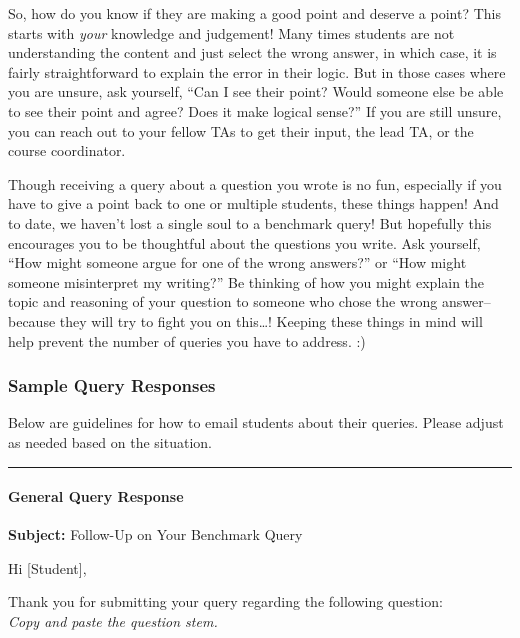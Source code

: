\documentclass[
]{article}
\begin{document}
So, how do you know if they are making a good point and deserve a point? This starts with \emph{your} knowledge and judgement! Many times students are not understanding the content and just select the wrong answer, in which case, it is fairly straightforward to explain the error in their logic. But in those cases where you are unsure, ask yourself, ``Can I see their point? Would someone else be able to see their point and agree? Does it make logical sense?'' If you are still unsure, you can reach out to your fellow TAs to get their input, the lead TA, or the course coordinator.

Though receiving a query about a question you wrote is no fun, especially if you have to give a point back to one or multiple students, these things happen! And to date, we haven't lost a single soul to a benchmark query! But hopefully this encourages you to be thoughtful about the questions you write. Ask yourself, ``How might someone argue for one of the wrong answers?'' or ``How might someone misinterpret my writing?'' Be thinking of how you might explain the topic and reasoning of your question to someone who chose the wrong answer-- because they will try to fight you on this\ldots! Keeping these things in mind will help prevent the number of queries you have to address. :)

\hypertarget{sample-query-responses}{%
\subsubsection{Sample Query Responses}\label{sample-query-responses}}

Below are guidelines for how to email students about their queries. Please adjust as needed based on the situation.

\begin{center}\rule{0.5\linewidth}{0.5pt}\end{center}

\hypertarget{general-query-response}{%
\paragraph{General Query Response}\label{general-query-response}}

\textbf{Subject:} Follow-Up on Your Benchmark Query

Hi {[}Student{]},

Thank you for submitting your query regarding the following question:\\
\emph{Copy and paste the question stem.}
\end{document}
